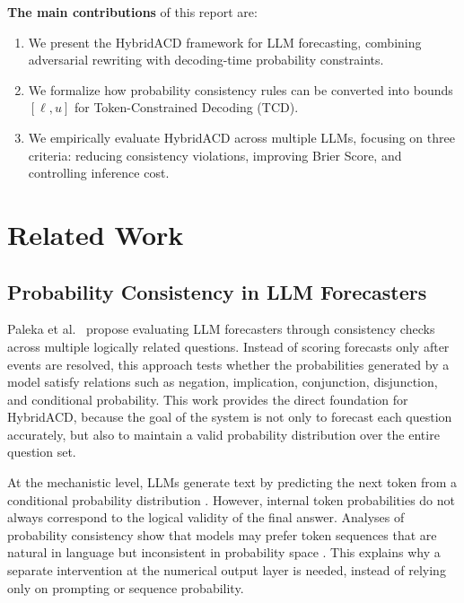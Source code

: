 \documentclass[pdflatex,sn-mathphys-num]{sn-jnl}
\begin{document}
\textbf{The main contributions} of this report are:
\begin{enumerate}
  \item We present the HybridACD framework for LLM forecasting, combining adversarial rewriting with decoding-time probability constraints.
  \item We formalize how probability consistency rules can be converted into bounds $[\ell,u]$ for Token-Constrained Decoding (TCD).
  \item We empirically evaluate HybridACD across multiple LLMs, focusing on three criteria: reducing consistency violations, improving Brier Score, and controlling inference cost.
\end{enumerate}

\section{Related Work}\label{sec:related}

\subsection{Probability Consistency in LLM Forecasters}

Paleka et al.\ \cite{ref1} propose evaluating LLM forecasters through consistency checks across multiple logically related questions. Instead of scoring forecasts only after events are resolved, this approach tests whether the probabilities generated by a model satisfy relations such as negation, implication, conjunction, disjunction, and conditional probability. This work provides the direct foundation for HybridACD, because the goal of the system is not only to forecast each question accurately, but also to maintain a valid probability distribution over the entire question set.

At the mechanistic level, LLMs generate text by predicting the next token from a conditional probability distribution \cite{ref2}. However, internal token probabilities do not always correspond to the logical validity of the final answer. Analyses of probability consistency show that models may prefer token sequences that are natural in language but inconsistent in probability space \cite{ref4,ref5}. This explains why a separate intervention at the numerical output layer is needed, instead of relying only on prompting or sequence probability.
\end{document}
